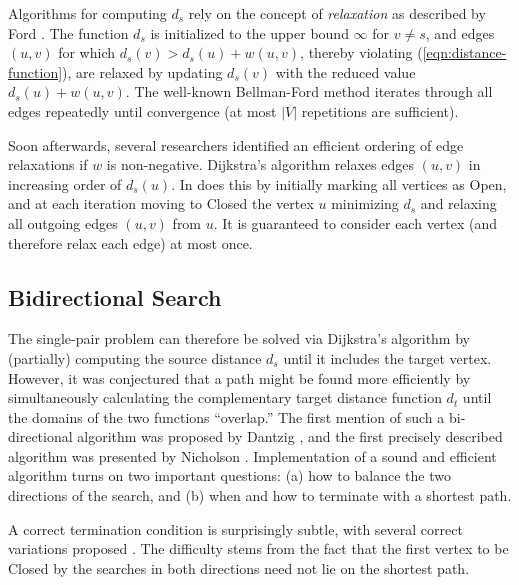 Algorithms for computing $d_s$ rely on the concept of
\emph{relaxation}
as described by Ford \citep{ford1955networkflowtheory}.
The function $d_s$
is initialized to the upper bound $\infty$ for $v \neq s$,
and edges $(u,v)$ for which $d_s(v) > d_s(u) + w(u,v)$,
thereby violating (\ref{eqn:distance-function}),
are relaxed by updating $d_s(v)$
with the reduced value $d_s(u) + w(u,v)$.
The well-known Bellman-Ford method
\citep{shimbel1955communicationnets, bellman1958routing,
moore1959spmaze}
iterates through all edges repeatedly until convergence
(at most $|V|$ repetitions are sufficient).

Soon afterwards,
several researchers
identified \citep{leyzorek1957modeltechniques, dijkstra1959anote}
an efficient ordering of edge relaxations
if $w$ is non-negative.
Dijkstra's algorithm relaxes edges $(u,v)$
in increasing order of $d_s(u)$.
In does this by initially marking all vertices as {\sc Open},
and at each iteration moving to {\sc Closed}
the vertex $u$ minimizing $d_s$
and relaxing all outgoing edges $(u,v)$ from $u$.
It is guaranteed to consider each vertex
(and therefore relax each edge) at most once.

\subsection{Bidirectional Search}

The single-pair problem can therefore be solved
via Dijkstra's algorithm
by (partially) computing the source distance $d_s$ until it
includes the target vertex.
However,
it was conjectured that a path might be found more efficiently
by simultaneously calculating the complementary
target distance function $d_t$
until the domains of the two functions ``overlap.''
The first mention of such a bi-directional algorithm
was proposed by Dantzig \citep{dantzig1963linearprogramming},
and the first precisely described algorithm was presented by
Nicholson \citep{nicholson1966shortest}.
Implementation of a sound and efficient algorithm
turns on two important questions:
(a) how to balance the two directions of the search,
and (b) when and how to terminate with a shortest path.


A correct termination condition is surprisingly subtle,%
with several correct variations proposed
\citep{nicholson1966shortest, dreyfus1969appraisalsp,
pohl1969bidirectional, goldberg2005spexternalmemory}.
The difficulty stems from the fact that the first vertex to be
{\sc Closed} by the searches in both directions
need not lie on the shortest path.

